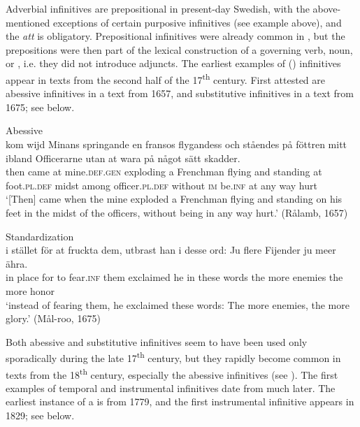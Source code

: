 \documentclass[output=paper]{langscibook}
\begin{document}
Adverbial infinitives are prepositional in present-day Swedish, with the above-mentioned exceptions of certain purposive infinitives (see example  above), and the  \textit{att} is obligatory. Prepositional infinitives were already common in , but the prepositions were then part of the lexical construction of a governing verb, noun, or , i.e. they did not introduce  adjuncts. The earliest examples of  () infinitives appear in texts from the second half of the 17\textsuperscript{th} century. First attested are abessive infinitives in a text from 1657, and substitutive infinitives in a text from 1675; see  below. 


\ea
\label{ex:kalm:12}
\ea {}Abessive\\\label{ex:kalm:12a}
\gll[Då] kom wijd Minans springande en fransos flygandess och ståendes på föttren       mitt ibland Officerarne utan at wara på något sätt skadder.\\
then came at mine.\textsc{def.gen} exploding a Frenchman flying and standing at foot.\textsc{pl.def} midst among officer.\textsc{pl.def} without \textsc{im} be.\textsc{inf} at any way hurt \\ 
\glt ‘[Then] came when the mine exploded a Frenchman flying and standing on his feet in the midst of the officers, without being in any way hurt.’ (Rålamb, 1657)

\ex {}Standardization\\\label{ex:kalm:12b}
\gll i stället för at fruckta dem, utbrast han i desse ord: Ju flere Fijender ju meer ähra.\\
 in place for to fear.\textsc{inf} them exclaimed he in these words the more enemies the more honor\\
\glt ‘instead of fearing them, he exclaimed these words: The more enemies, the more glory.’ (Mål-roo, 1675)
\z 
\z 


Both abessive and substitutive infinitives seem to have been used only sporadically during the late 17\textsuperscript{th} century, but they rapidly become common in texts from the 18\textsuperscript{th} century, especially the abessive infinitives (see \citealt[129–130]{Kalm2016Satsekvivalenta}). The first examples of temporal and instrumental infinitives date from much later. The earliest instance of a  is from 1779, and the first instrumental infinitive appears in 1829; see  below.  
\end{document}
